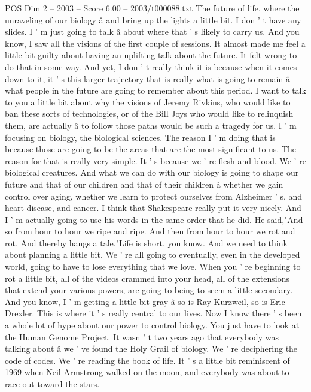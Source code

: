 \begin{textsample}{POS Dim 2 – 2003 – Score 6.00 – 2003/t000088.txt}  \label{ex:f2_pos_080}
The future of life, where the unraveling of our biology â and bring up the lights a little bit.
I don ' t have any slides.
I ' m just going to talk â about where that ' s likely to carry us.
And you know, I saw all the visions of the first couple of sessions.
It almost made me feel a little bit guilty about having an uplifting talk about the future.
It felt wrong to do that in some way.
And yet, I don ' t really think it is because when it comes down to it, it ' s this larger trajectory that is really what is going to remain â what people in the future are going to remember about this period.
I want to talk to you a little bit about why the visions of Jeremy Rivkins, who would like to ban these sorts of technologies, or of the Bill Joys who would like to relinquish them, are actually â to follow those paths would be such a tragedy for us.
I ' m focusing on biology, the biological sciences.
The reason I ' m doing that is because those are going to be the areas that are the most significant to us.
The reason for that is really very simple.
It ' s because we ' re flesh and blood.
We ' re biological creatures.
And what we can do with our biology is going to shape our future and that of our children and that of their children â whether we gain control over aging, whether we learn to protect ourselves from Alzheimer ' s, and heart disease, and cancer.
I think that Shakespeare really put it very nicely.
And I ' m actually going to use his words in the same order that he did.
He said,"And so from hour to hour we ripe and ripe.
And then from hour to hour we rot and rot.
And thereby hangs a tale."Life is short, you know.
And we need to think about planning a little bit.
We ' re all going to eventually, even in the developed world, going to have to lose everything that we love.
When you ' re beginning to rot a little bit, all of the videos crammed into your head, all of the extensions that extend your various powers, are going to being to seem a little secondary.
And you know, I ' m getting a little bit gray â so is Ray Kurzweil, so is Eric Drexler.
This is where it ' s really central to our lives.
Now I know there ' s been a whole lot of hype about our power to control biology.
You just have to look at the Human Genome Project.
It wasn ' t two years ago that everybody was talking about â we ' ve found the Holy Grail of biology.
We ' re deciphering the code of codes.
We ' re reading the book of life.
It ' s a little bit reminiscent of 1969 when Neil Armstrong walked on the moon, and everybody was about to race out toward the stars.

\end{textsample}
